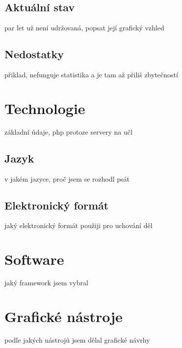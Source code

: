         \subsection{Aktuální stav}
            par let už není udržovaná, popsat její grafický vzhled
            
        \subsection{Nedostatky}
            přiklad, nefunguje statistika a je tam až přiliš zbytečností
            
    \section{Technologie}
        základní údaje, php protoze servery na učl
        \subsection{Jazyk}
            v jakém jazyce, proč jsem se rozhodl psát
        \subsection{Elektronický formát}
            jaký elektronický formát použiji pro uchování děl
    \section{Software}
        jaký framework jsem vybral
    \section{Grafické nástroje}
        podle jakých nástrojů jsem dělal grafické návrhy

